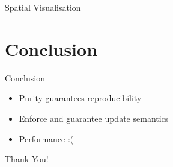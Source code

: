 \documentclass{beamer}
\begin{document}
\begin{frame}{Spatial Visualisation}
\end{frame}

\section{Conclusion}
%  
%  
%  

\begin{frame}{Conclusion}
  \begin{itemize}
    \item Purity guarantees reproducibility 
    \item Enforce and guarantee update semantics 
    \item Performance :(
  \end{itemize}
\end{frame}

\begin{frame}{}
  \begin{center}
  Thank You!
  \end{center}
\end{frame}
\end{document}
